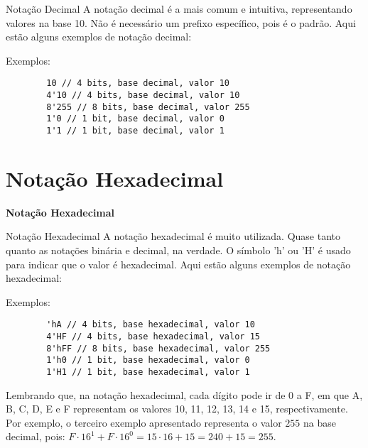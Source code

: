 \documentclass[aspectratio=169,xcolor=dvipsnames]{beamer}
\begin{document}
\begin{frame}[fragile]{Notação Decimal}
A notação decimal é a mais comum e intuitiva, representando valores na base 10. Não é necessário um prefixo específico, pois é o padrão. Aqui estão alguns exemplos de notação decimal:
    \begin{block}{Exemplos:}
        \begin{verbatim}
        10 // 4 bits, base decimal, valor 10
        4'10 // 4 bits, base decimal, valor 10
        8'255 // 8 bits, base decimal, valor 255
        1'0 // 1 bit, base decimal, valor 0
        1'1 // 1 bit, base decimal, valor 1
        \end{verbatim}
    \end{block}
\end{frame}

\section{Notação Hexadecimal}
\begin{frame}
    \Huge{\centerline{\textbf{Notação Hexadecimal}}}
\end{frame}

\begin{frame}[fragile]{Notação Hexadecimal}
A notação hexadecimal é muito utilizada. Quase tanto quanto as notações binária e decimal, na verdade. O símbolo 'h' ou 'H' é usado para indicar que o valor é hexadecimal. Aqui estão alguns exemplos de notação hexadecimal:
    \begin{block}{Exemplos:}
        \begin{verbatim}
        'hA // 4 bits, base hexadecimal, valor 10
        4'HF // 4 bits, base hexadecimal, valor 15
        8'hFF // 8 bits, base hexadecimal, valor 255
        1'h0 // 1 bit, base hexadecimal, valor 0
        1'H1 // 1 bit, base hexadecimal, valor 1
        \end{verbatim}
    \end{block}
Lembrando que, na notação hexadecimal, cada dígito pode ir de 0 a F, em que A, B, C, D, E e F representam os valores 10, 11, 12, 13, 14 e 15, respectivamente. Por exemplo, o terceiro exemplo apresentado representa o valor $255$ na base decimal, pois: $F\cdot16^1 + F\cdot16^0 = 15\cdot16 + 15 = 240 + 15 = 255.$
\end{frame}
\end{document}
